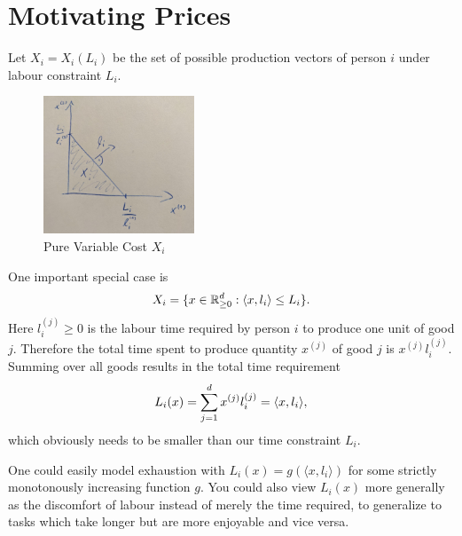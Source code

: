 \section{Motivating Prices}

Let \(X_i = X_i(L_i)\) be the set of possible production vectors of person \(i\)
under labour constraint \(L_i\).
\\
\begin{figure}
	\includegraphics[width=0.4\textwidth]{images/pure-variable-cost.jpeg}
	\caption{Pure Variable Cost \(X_i\)}
\end{figure}
\begin{example}
	One important special case is
	\[
		X_i = \{ x \in \mathbb{R}_{\ge 0}^d: \langle x, l_i \rangle \le L_i \}.
	\]
	Here \(l_i^{(j)}\ge0\) is the labour time required by person \(i\) to produce one
	unit of good \(j\). Therefore the total time spent to produce quantity
	\(x^{(j)}\) of good \(j\) is \(x^{(j)}l_i^{(j)}\). Summing over all goods
	results in the total time requirement
	\[
		L_i(x) = \sum_{j=1}^d x^{(j)}l_i^{(j)} = \langle x, l_i\rangle,
	\]
	which obviously needs to be smaller than our time constraint \(L_i\).

	One could easily model exhaustion with \(L_i(x) = g(\langle x, l_i\rangle)\)
	for some strictly monotonously increasing function \(g\). You could also
	view \(L_i(x)\) more generally as the discomfort of labour instead of merely
	the time required, to generalize to tasks which take longer but are more
	enjoyable and vice versa.
\end{example}


